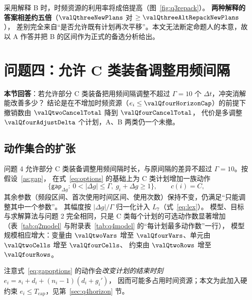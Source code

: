 采用解释 B 时，时频资源的利用率将成倍提高（图~\ref{fig:q3repack}）。
\textbf{两种解释的答案相差约五倍}（$\valQthreeNewPlans$ 对 $\ge\valQthreeAltRepackNewPlans$），
差别完全来自“是否允许既有计划再次平移”。本文无法断定命题人的本意，故以 A 作答并把 B 的区间作为正式的备选分析给出。


\section{问题四：允许 C 类装备调整用频间隔}
\label{sec:q4}

\noindent\textbf{本节回答}：若允许部分 C 类装备把用频间隔调整不超过 $\Gamma=10$ 个 $\Delta t$，冲突消解能改善多少？
结论是在不增加时频资源（$e_i\le\valQfourHorizonCap$）的前提下撤销数由 $\valQtwoCancelTotal$ 降到 $\valQfourCancelTotal$，
代价是多调整 $\valQfourAdjustDelta$ 个计划，A、B 两类仍一个未撤。

\subsection{动作集合的扩张}

问题 4 允许部分 C 类装备调整用频间隔时长，与原间隔的差异不超过 $\Gamma=10$。按假设~\ref{as:gap}，
在式~\eqref{eq:options} 的基础上为 C 类计划增加一族动作
\begin{equation}\label{eq:gapoptions}
  \{\textsf{gap}_{\Delta g}:\ 0<|\Delta g|\le\Gamma,\ g_i+\Delta g\ge 1\},\qquad c(i)=C,
\end{equation}
其余参数（频段区间、首次使用时间区间、使用次数）保持不变，仍满足“只能调整其中一个参数”。
其幅度按 $|\Delta g|/\Gamma$ 归一化计入 $L_7$（式~\eqref{eq:lex}）。
模型、目标与求解算法与问题 2 完全相同，只是 C 类每个计划的可选动作数显著增加
（表~\ref{tab:q2model} 与附录表~\ref{tab:q4model} 的“每计划最多动作数”一行），
模型规模相应增大：变量由 $\valQtwoVars$ 增至 $\valQfourVars$、单元由 $\valQtwoCells$ 增至 $\valQfourCells$、
约束由 $\valQtwoRows$ 增至 $\valQfourRows$。

注意式~\eqref{eq:gapoptions} 的动作会\emph{改变计划的结束时刻} $e_i=s_i+d_i+(n_i-1)(d_i+g_i')$，
因而可能多占用时间资源；本文为此加入硬约束 $e_i\le T_{\mathrm{cap}}$，见第~\ref{sec:q4horizon} 节。


